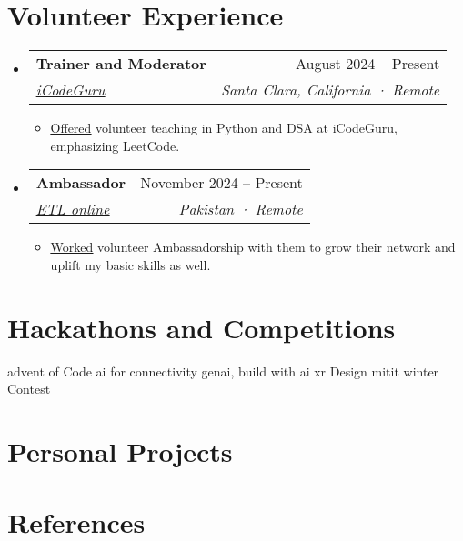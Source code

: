 \documentclass[letterpaper,11pt]{article}
\makeatletter
\newcommand{\resumeItem}[1]{
  \item\small{
    {#1 \vspace{-2pt}}
  }
}
\newcommand{\resumeSubheading}[4]{
  \vspace{-2pt}\item
    \begin{tabular*}{0.97\textwidth}[t]{l@{\extracolsep{\fill}}r}
      \textbf{#1} & #2 \\
      \textit{\small#3} & \textit{\small #4} \\
    \end{tabular*}\vspace{-7pt}
}
\newcommand{\resumeSubHeadingListStart}{\begin{itemize}[leftmargin=0.15in, label={}]}
\newcommand{\resumeSubHeadingListEnd}{\end{itemize}}
\newcommand{\resumeItemListStart}{\begin{itemize}}
\newcommand{\resumeItemListEnd}{\end{itemize}\vspace{-5pt}}
\makeatother
\begin{document}
\section{\textbf{Volunteer Experience}}
\resumeSubHeadingListStart

\resumeSubheading
{Trainer and Moderator}{August 2024 -- Present}
{{\href{https://www.linkedin.com/company/icode-guru/mycompany/}{\underline{iCodeGuru}}}}{Santa Clara, California · Remote}

\resumeItemListStart

\resumeItem{{\href{https://github.com/Haris-Mughal}{\underline{Offered}}} volunteer teaching in Python and DSA at iCodeGuru, emphasizing LeetCode.}

\resumeItemListEnd

\resumeSubheading
{Ambassador}{November 2024 -- Present}
{{\href{https://www.linkedin.com/company/etlonline}{\underline{ETL online}}}}{Pakistan · Remote}

\resumeItemListStart

\resumeItem{{\href{https://github.com/Haris-Mughal}{\underline{Worked}}} volunteer Ambassadorship with them to grow their network and uplift my basic skills as well.}

\resumeItemListEnd

\resumeSubHeadingListEnd
%



\section{\textbf{Hackathons and Competitions}}
\resumeSubHeadingListStart

advent of Code
ai for connectivity
genai, build with ai
xr Design
mitit winter Contest



\resumeSubHeadingListEnd
%

\section{\textbf{Personal Projects}}
\resumeSubHeadingListStart

%

\resumeSubHeadingListEnd


\section{\textbf{References}}
\resumeSubHeadingListStart

%

\resumeSubHeadingListEnd

%

\end{document}
